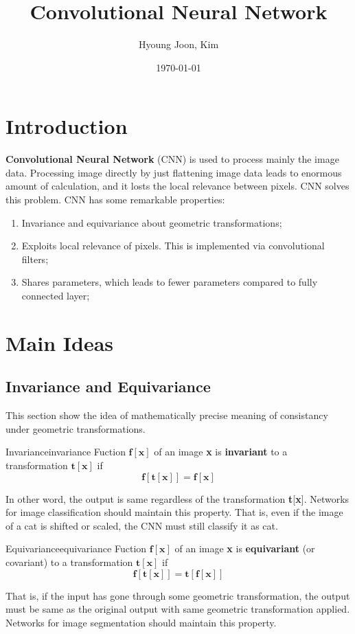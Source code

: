 \documentclass{article}
\title{Convolutional Neural Network}
\author{Hyoung Joon, Kim}
\date{\today}
\begin{document}
\maketitle
\tableofcontents

\newpage
\section{Introduction}
    \textbf{Convolutional Neural Network} (CNN) is used to process mainly the image data.
    Processing image directly by just flattening image data leads to enormous amount of calculation,
    and it losts the local relevance between pixels. CNN solves this problem.
    CNN has some remarkable properties:
    \begin{enumerate}
        \item Invariance and equivariance about geometric transformations;
        \item Exploits local relevance of pixels. This is implemented via convolutional filters;
        \item Shares parameters, which leads to fewer parameters compared to fully connected layer; 
    \end{enumerate}

\newpage
\section{Main Ideas}
    \subsection{Invariance and Equivariance}
        This section show the idea of mathematically precise meaning of consistancy under geometric transformations.

        \begin{defn}{Invariance}{invariance}
            Fuction $\textbf{f}[\textbf{x}]$ of an image \textbf{x} is \textbf{invariant} to a transformation
            $\textbf{t}[\textbf{x}]$ if
            \[
            \textbf{f}[\textbf{t}[\textbf{x}]]=\textbf{f}[\textbf{x}]
            \]
        \end{defn}
        In other word, the output is same regardless of the transformation \textbf{t}[\textbf{x}].
        Networks for image classification should maintain this property.
        That is, even if the image of a cat is shifted or scaled, the CNN must still classify it as cat.

        \begin{defn}{Equivariance}{equivariance}
            Fuction $\textbf{f}[\textbf{x}]$ of an image \textbf{x} is \textbf{equivariant} (or covariant) to a transformation
            $\textbf{t}[\textbf{x}]$ if
            \[
            \textbf{f}[\textbf{t}[\textbf{x}]]=\textbf{t}[\textbf{f}[\textbf{x}]]
            \]
        \end{defn}
        That is, if the input has gone through some geometric transformation,
        the output must be same as the original output with same geometric transformation applied.
        Networks for image segmentation should maintain this property.
\end{document}
